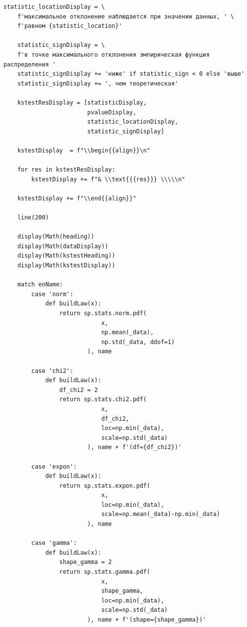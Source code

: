 \documentclass[a4paper, 14pt]{extarticle}
\begin{document}
\begin{lstlisting}[caption={Анализ и вывод полученных данных в ходе теста Колмогорова-Смирнова}, label={lst:11}]
    statistic_locationDisplay = \
    f'максимальное отклонение наблюдается при значении данных, ' \
    f'равном {statistic_location}'

    statistic_signDisplay = \
    f'в точке максимального отклонения эмпирическая функция распределения '
    statistic_signDisplay += 'ниже' if statistic_sign < 0 else 'выше'
    statistic_signDisplay += ', чем теоретическая'

    kstestResDisplay = [statisticDisplay, 
                        pvalueDisplay, 
                        statistic_locationDisplay, 
                        statistic_signDisplay]

    kstestDisplay  = f"\\begin{{align}}\n" 

    for res in kstestResDisplay:
        kstestDisplay += f"& \\text{{{res}}} \\\\\n"

    kstestDisplay += f"\\end{{align}}" 

    line(200)

    display(Math(heading))
    display(Math(dataDisplay))
    display(Math(kstestHeading))
    display(Math(kstestDisplay))

    match enName:
        case 'norm': 
            def buildLaw(x):
                return sp.stats.norm.pdf(
                            x, 
                            np.mean(_data), 
                            np.std(_data, ddof=1)
                        ), name

        case 'chi2': 
            def buildLaw(x):
                df_chi2 = 2
                return sp.stats.chi2.pdf(
                            x, 
                            df_chi2, 
                            loc=np.min(_data), 
                            scale=np.std(_data)
                        ), name + f'(df={df_chi2})'

        case 'expon': 
            def buildLaw(x):
                return sp.stats.expon.pdf(
                            x, 
                            loc=np.min(_data), 
                            scale=np.mean(_data)-np.min(_data)
                        ), name

        case 'gamma': 
            def buildLaw(x):
                shape_gamma = 2
                return sp.stats.gamma.pdf(
                            x, 
                            shape_gamma, 
                            loc=np.min(_data), 
                            scale=np.std(_data)
                        ), name + f'(shape={shape_gamma})'
            

\end{lstlisting}
\end{document}
